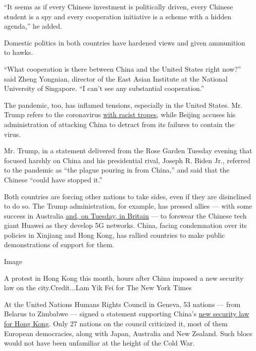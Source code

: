 ``It seems as if every Chinese investment is politically driven, every
Chinese student is a spy and every cooperation initiative is a scheme
with a hidden agenda,'' he added.

Domestic politics in both countries have hardened views and given
ammunition to hawks.

``What cooperation is there between China and the United States right
now?'' said Zheng Yongnian, director of the East Asian Institute at the
National University of Singapore. ``I can't see any substantial
cooperation.''

The pandemic, too, has inflamed tensions, especially in the United
States. Mr. Trump refers to the coronavirus
\href{https://www.nytimes3xbfgragh.onion/2020/06/23/us/politics/trump-race-racism-protests.html}{with
racist tropes}, while Beijing accuses his administration of attacking
China to detract from its failures to contain the virus.

Mr. Trump, in a statement delivered from the Rose Garden Tuesday evening
that focused harshly on China and his presidential rival, Joseph R.
Biden Jr., referred to the pandemic as ``the plague pouring in from
China,'' and said that the Chinese ``could have stopped it.''

Both countries are forcing other nations to take sides, even if they are
disinclined to do so. The Trump administration, for example, has pressed
allies --- with some success in Australia
\href{https://www.nytimes3xbfgragh.onion/2020/07/14/business/uk-bans-huawei-from-5g-network-raising-tensions-with-china.html}{and,
on Tuesday, in Britain} --- to forswear the Chinese tech giant Huawei as
they develop 5G networks. China, facing condemnation over its policies
in Xinjiang and Hong Kong, has rallied countries to make public
demonstrations of support for them.

Image

A protest in Hong Kong this month, hours after China imposed a new
security law on the city.Credit...Lam Yik Fei for The New York Times

At the United Nations Humans Rights Council in Geneva, 53 nations ---
from Belarus to Zimbabwe --- signed a statement supporting China's
\href{https://www.nytimes3xbfgragh.onion/2020/06/29/world/asia/china-hong-kong-security-law-rules.html}{new
security law for Hong Kong}. Only 27 nations on the council criticized
it, most of them European democracies, along with Japan, Australia and
New Zealand. Such blocs would not have been unfamiliar at the height of
the Cold War.

